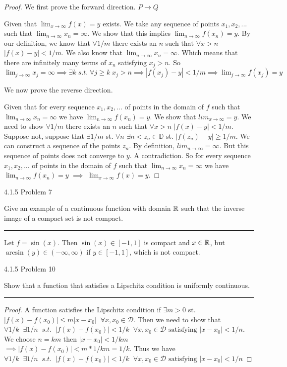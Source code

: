 \documentclass[11pt]{article}
\renewcommand{\sp}{\; \;}
\begin{document}
\begin{proof}

We first prove the forward direction. $P \to Q$

Given that $\lim_{x \to \infty} f(x) = y$ exists. We take any sequence of points $x_1, x_2, ...$ such that $\lim_{n \to \infty} x_n = \infty$. We show that this implies $\lim_{n \to \infty} f(x_n) = y$. By our definition, we know that $\forall 1/m$ there exists an $n$ such that $\forall x > n$ $|f(x) - y| < 1/m$. We also know that $\lim_{n \to \infty} x_n = \infty$. Which means that there are infinitely many terms of $x_n$ satisfying $x_j > n$. So $\lim_{j \to \infty} x_j = \infty \implies \exists k \; s.t. \; \forall j \geq k \; x_j > n \implies |f(x_j) - y| < 1/m \implies \lim_{j \to \infty} f(x_j) = y$

We now prove the reverse direction.

Given that for every sequence $x_1, x_2, ...$ of points in the domain of $f$ such that $\lim_{n \to \infty} x_n = \infty$ we have $\lim_{n\to \infty} f(x_n) = y$. 
We show that $lim_{x \to \infty} = y$. We need to show $\forall 1/m$ there exists an $n$ such that $\forall x > n$ $|f(x) - y| < 1/m$. 
Suppose not, suppose that $\exists 1/m$ st. $\forall n$ $\exists n < z_n \in \mathbb{D}$ st. $|f(z_n) - y| \geq 1/m$. We can construct a sequence of the points $z_n$. By definition, $lim_{n \to \infty} = \infty$. But this sequence of points does not converge to $y$. A contradiction. So for every sequence $x_1, x_2, ...$ of points in the domain of $f$ such that $\lim_{n \to \infty} x_n = \infty$ we have $\lim_{n\to \infty} f(x_n) = y$ $\implies$ $\lim_{x \to \infty} f(x) = y$.

\end{proof}



\newpage
{} 4.1.5 Problem 7

Give an example of a continuous function with domain $\mathbb{R}$ such that the inverse image of a compact set is not compact. 

\hrule


Let $f = \sin(x)$. Then $\sin(x) \in [-1, 1]$ is compact and $x \in \mathbb{R}$, but $\arcsin(y) \in (-\infty, \infty)$ if $y \in [-1, 1]$, which is not compact. 



\newpage
{} 4.1.5 Problem 10

Show that a function that satisfies a Lipschitz condition is uniformly continuous.
\hrule


\begin{proof}

A function satisfies the Lipschitz condition if $\exists m > 0$ st. $|f(x) - f(x_0) | \leq m |x-x_0| \sp \forall x, x_0 \in \mathcal{D}$. 
Then we need to show that $\forall 1/k \sp \exists 1/n \sp s.t. \sp |f(x) - f(x_0)| < 1/k \sp \forall x, x_0 \in \mathcal{D} \text{ satisfying } |x-x_0| < 1/n$. 
We choose $n = k m$ then $|x - x_0| < 1/km$ $\implies |f(x) - f(x_0)| < m * 1/km = 1/k$. 
Thus we have  $\forall 1/k \sp \exists 1/n \sp s.t. \sp |f(x) - f(x_0)| < 1/k \sp \forall x, x_0 \in \mathcal{D} \text{ satisfying } |x-x_0| < 1/n$

\end{proof}
\end{document}
